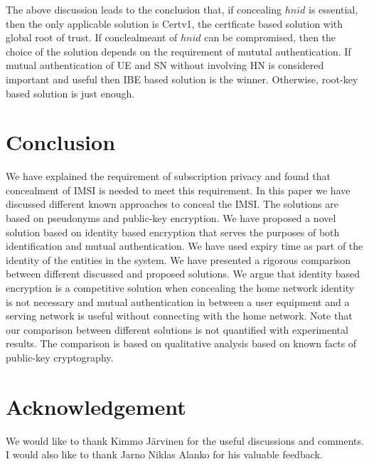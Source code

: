 \documentclass[runningheads,a4paper]{llncs} %
\begin{document}
The above discussion leads to the conclusion that, if concealing $hnid$ is essential, then the only applicable solution is Certv1, the certficate based solution with global root of trust. If conclealmeant of $hnid$ can be compromised, then the choice  of the solution depends on the requirement of mututal authentication. If mutual authentication of UE and SN without involving HN is considered important and useful then IBE based solution is the winner. Otherwise, root-key based solution is just enough.


\section{Conclusion}
\label{sec:conclusion}
We have explained the requirement of subscription privacy and found that concealment of IMSI is needed to meet this requirement. In this paper we have discussed different known approaches to conceal the IMSI. The solutions  are based on pseudonyms and public-key encryption. We have proposed a novel solution based on identity based encryption that serves the purposes of both identification and mutual authentication. We have used expiry time as part of the identity of the entities in the system. We have presented a rigorous comparison between different discussed and proposed solutions. We argue that identity based encryption is a competitive solution when concealing the home network identity is not necessary and mutual authentication in between a user equipment and a serving network is useful without connecting with the home network. Note that our comparison between different solutions is not quantified with experimental results. The comparison is based on qualitative analysis based on known facts of public-key cryptography. 

\section{Acknowledgement}
\label{sec:acknowledgement}
We would like to thank Kimmo J\"arvinen for the useful discussions and comments. I would also like to thank Jarno Niklas Alanko for his valuable feedback.
\end{document}
